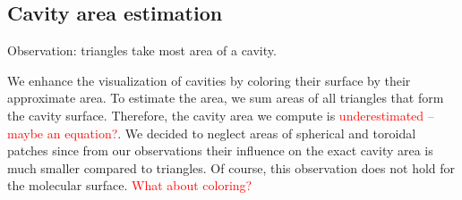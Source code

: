 \subsection{Cavity area estimation}
Observation: triangles take most area of a cavity.

We enhance the visualization of cavities by coloring their surface by their approximate area.
To estimate the area, we sum areas of all triangles that form the cavity surface.
Therefore, the cavity area we compute is \textcolor{red}{underestimated -- maybe an equation?}.
We decided to neglect areas of spherical and toroidal patches since from our observations their influence on the exact cavity area is much smaller compared to triangles.
Of course, this observation does not hold for the molecular surface.
\textcolor{red}{What about coloring?}
